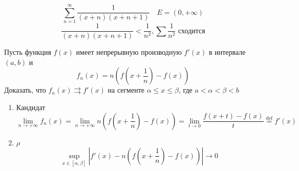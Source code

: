 \begin{exercise}[2772]
    \[\sum_{n = 1}^{\infty} \frac{1}{(x + n)(x + n + 1)} \quad E = (0, +\infty)\]
    \[\frac{1}{(x + n)(x + n + 1)} < \frac{1}{n^2}, \sum \frac{1}{n^2} \text{ сходится}\]
\end{exercise}

\begin{exercise}[2765]
    Пусть функция \(f(x)\) имеет непрерывную производную \(f'(x)\) в интервале \((a, b)\) и
    \[f_n(x) = n\left( f\left( x + \frac{1}{n} \right) - f(x) \right)\]
    Доказать, что \(f_n(x) \rightrightarrows f'(x)\) на сегменте \(\alpha \leq x \leq \beta\), где \(a < \alpha < \beta < b\)

    \begin{enumerate}
        \item Кандидат
              \[\lim_{n\to +\infty} f_n(x) = \lim_{n\to +\infty} n\left( f\left( x + \frac{1}{n} \right) - f(x) \right) = \lim_{t\to 0} \frac{f\left( x + t \right) - f(x)}{t} \stackrel{\text{def}}{=} f'(x)\]
        \item \(\rho\)
              \[\sup_{x\in [\alpha, \beta]} \left|f'(x) - n\left( f\left( x + \frac{1}{n} \right) - f(x) \right)\right| \to 0\]
    \end{enumerate}
\end{exercise}

